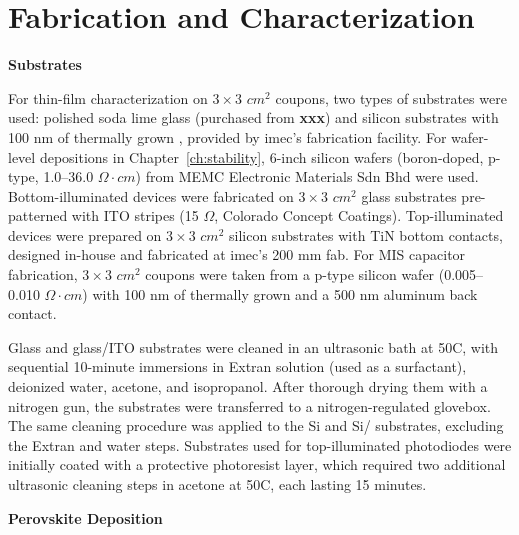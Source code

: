 \chapter{Fabrication and Characterization}\label{ch:appendixA}

\textbf{Substrates}

For thin-film characterization on $3 \times 3$ $cm^2$ coupons, two types of substrates were used: polished soda lime glass (purchased from \textbf{xxx}) and silicon substrates with 100 nm of thermally grown , provided by imec's fabrication facility. For wafer-level depositions in Chapter~\ref{ch:stability}, 6-inch silicon wafers (boron-doped, p-type, 1.0–36.0 $\Omega\cdot cm$) from MEMC Electronic Materials Sdn Bhd were used. Bottom-illuminated devices were fabricated on $3 \times 3$ $cm^2$ glass substrates pre-patterned with ITO stripes (15 $\Omega$, Colorado Concept Coatings). Top-illuminated devices were prepared on $3 \times 3$ $cm^2$ silicon substrates with TiN bottom contacts, designed in-house and fabricated at imec's 200 mm fab. For MIS capacitor fabrication, $3 \times 3$ $cm^2$ coupons were taken from a p-type silicon wafer (0.005–0.010 $\Omega\cdot cm$) with 100 nm of thermally grown  and a 500 nm aluminum back contact.

Glass and glass/ITO substrates were cleaned in an ultrasonic bath at 50\degree C, with sequential 10-minute immersions in Extran solution (used as a surfactant), deionized water, acetone, and isopropanol. After thorough drying them with a nitrogen gun, the substrates were transferred to a nitrogen-regulated glovebox. The same cleaning procedure was applied to the Si and Si/ substrates, excluding the Extran and water steps. Substrates used for top-illuminated photodiodes were initially coated with a protective photoresist layer, which required two additional ultrasonic cleaning steps in acetone at 50\degree C, each lasting 15 minutes.


\textbf{Perovskite Deposition}

